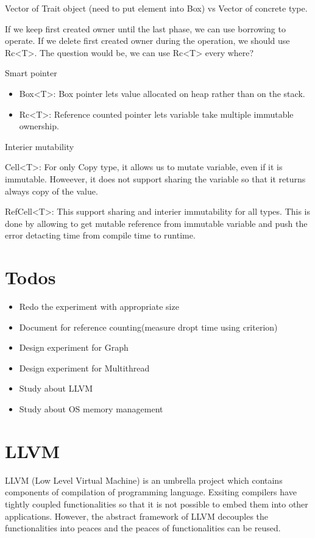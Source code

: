 Vector of Trait object (need to put element into Box) vs Vector of concrete type.


If we keep first created owner until the last phase, we can use borrowing to operate.
If we delete first created owner during the operation, we should use Rc<T>.
The question would be, we can use Rc<T> every where?

Smart pointer
\begin{itemize}
    \item Box<T>: Box pointer lets value allocated on heap rather than on the stack.
    \item Rc<T>: Reference counted pointer lets variable take multiple immutable ownership.
\end{itemize}

Interier mutability
    \item Cell<T>: For only Copy type, it allows us to mutate variable, even if it is immutable. Howeever, it does not support sharing the variable so that it returns always copy of the value.
    \item RefCell<T>: This support sharing and interier immutability for all types. This is done by allowing to get mutable reference from immutable variable and push the error detacting time from compile time to runtime.
    
\section{Todos}
\label{sec:history}
\begin{itemize}
    \item Redo the experiment with appropriate size
    \item Document for reference counting(measure dropt time using criterion)
    \item Design experiment for Graph
    \item Design experiment for Multithread
    \item Study about LLVM
    \item Study about OS memory management
\end{itemize}

\section{LLVM}
\label{sec:history}
LLVM (Low Level Virtual Machine) is an umbrella project which contains components of compilation of programming language.
Exsiting compilers have tightly coupled functionalities so that it is not possible to embed them into other applications.
However, the abstract framework of LLVM decouples the functionalities into peaces and the peaces of functionalities can be reused.

